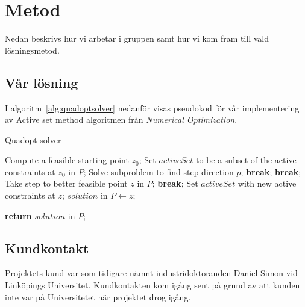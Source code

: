 \section{Metod}
Nedan beskrivs hur vi arbetar i gruppen samt hur vi kom fram till vald lösningsmetod. 



\subsection{Vår lösning}
I algoritm~\ref{alg:quadoptsolver} nedanför visas pseudokod för vår implementering av Active set method algoritmen från \emph{Numerical Optimization}.

\begin{algorithm}[H]
\caption{Quadopt-solver}
\label{alg:quadoptsolver}
\begin{algorithmic}
	\State Compute a feasible starting point $z_0$;
\EndIf	
\State Set $activeSet$ to be a subset of the active constraints at $z_0$ in $P$;
	\State Solve subproblem to find step direction $p$;
			\State \textbf{break};
		\EndIf		
			\State \textbf{break};
		\EndIf
	\Else
		\State Take step to better feasible point $z$ in $P$;
			\State \textbf{break};
		\EndIf
		\State Set $activeSet$ with new active constraints at $z$;	
	\EndIf
\EndWhile
\State  $solution$ in $P\gets z$;

\State \textbf{return} $solution$ in $P$;
	
\EndProcedure
\end{algorithmic}
\end{algorithm}


\subsection{Kundkontakt}
Projektets kund var som tidigare nämnt industridoktoranden Daniel Simon vid Linköpings Universitet. Kundkontakten kom igång sent på grund av att kunden inte var på Universitetet när projektet drog igång. 

